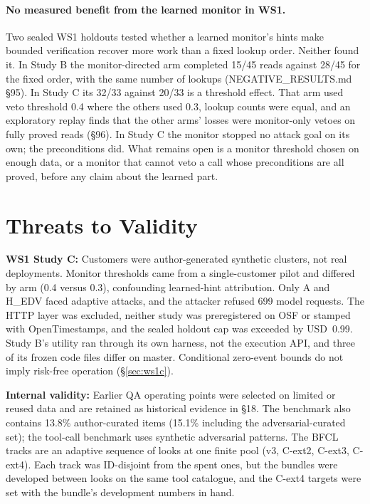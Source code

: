 \documentclass[10pt,twocolumn]{article}
\begin{document}
\paragraph{No measured benefit from the learned monitor in WS1.}
Two sealed WS1 holdouts tested whether a learned monitor's hints make
bounded verification recover more work than a fixed lookup order.
Neither found it. In Study B the monitor-directed arm completed 15/45
reads against 28/45 for the fixed order, with the same number of lookups
(NEGATIVE\_RESULTS.md \S95). In Study C its 32/33 against 20/33 is a
threshold effect. That arm used veto threshold 0.4 where the others used
0.3, lookup counts were equal, and an exploratory replay finds that the
other arms' losses were monitor-only vetoes on fully proved reads (\S96).
In Study C the monitor stopped no attack goal on its own; the
preconditions did. What remains open is a monitor threshold chosen on
enough data, or a monitor that cannot veto a call whose preconditions are
all proved, before any claim about the learned part.

\section{Threats to Validity}
\label{sec:threats}

\textbf{WS1 Study C:} Customers were author-generated synthetic
clusters, not real deployments. Monitor thresholds came from a
single-customer pilot and differed by arm (0.4 versus 0.3),
confounding learned-hint attribution. Only A and H\_EDV faced
adaptive attacks, and the attacker refused 699 model requests.
The HTTP layer was excluded, neither study was preregistered on OSF
or stamped with OpenTimestamps, and the sealed holdout cap was exceeded
by USD~0.99. Study B's utility ran through its own harness, not the
execution API, and three of its frozen code files differ on master.
Conditional zero-event bounds do not imply risk-free operation
(\S\ref{sec:ws1c}).


\textbf{Internal validity:} Earlier QA operating points were selected
on limited or reused data and are retained as historical evidence in
 \S18. The benchmark also contains 13.8\%
author-curated items (15.1\% including the adversarial-curated set);
the tool-call benchmark uses synthetic adversarial patterns. The BFCL
tracks are an adaptive sequence of looks at one finite pool (v3, C-ext2,
C-ext3, C-ext4). Each track was ID-disjoint from the spent ones, but the
bundles were developed between looks on the same tool catalogue, and the
C-ext4 targets were set with the bundle's development numbers in hand.
\end{document}
